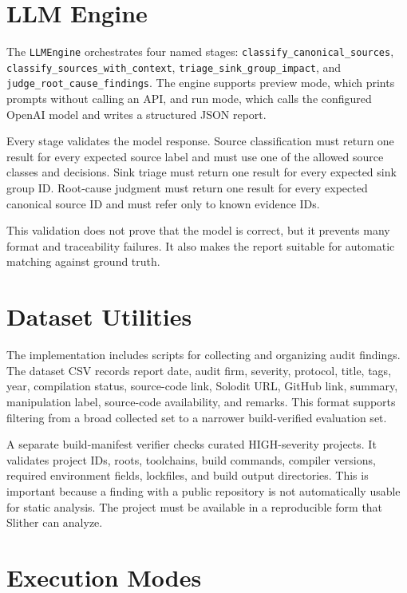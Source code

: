 \section{LLM Engine}

The \texttt{LLMEngine} orchestrates four named stages:
\texttt{classify\_canonical\_sources},
\texttt{classify\_sources\_with\_context},
\texttt{triage\_sink\_group\_impact}, and
\texttt{judge\_root\_cause\_findings}. The engine supports preview mode, which
prints prompts without calling an API, and run mode, which calls the configured
OpenAI model and writes a structured JSON report.

Every stage validates the model response. Source classification must return one
result for every expected source label and must use one of the allowed source
classes and decisions. Sink triage must return one result for every expected
sink group ID. Root-cause judgment must return one result for every expected
canonical source ID and must refer only to known evidence IDs.

This validation does not prove that the model is correct, but it prevents many
format and traceability failures. It also makes the report suitable for
automatic matching against ground truth.

\section{Dataset Utilities}

The implementation includes scripts for collecting and organizing audit findings.
The dataset CSV records report date, audit firm, severity, protocol, title,
tags, year, compilation status, source-code link, Solodit URL, GitHub link,
summary, manipulation label, source-code availability, and remarks. This format
supports filtering from a broad collected set to a narrower build-verified
evaluation set.

A separate build-manifest verifier checks curated HIGH-severity projects. It
validates project IDs, roots, toolchains, build commands, compiler versions,
required environment fields, lockfiles, and build output directories. This is
important because a finding with a public repository is not automatically
usable for static analysis. The project must be available in a reproducible
form that Slither can analyze.

\section{Execution Modes}

